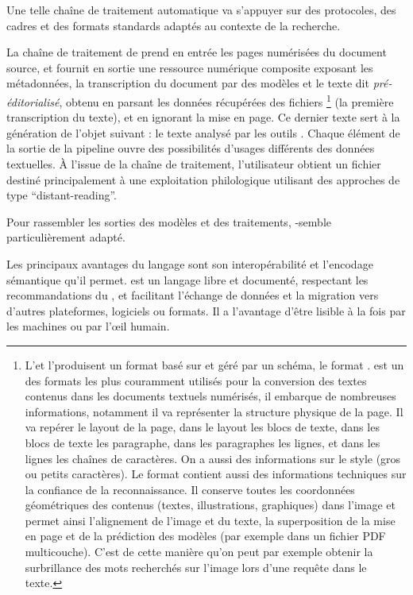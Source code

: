 Une telle chaîne de traitement automatique va s'appuyer sur des protocoles, des cadres et des formats standards adaptés au contexte de la recherche. 

La chaîne de traitement de \gaga prend en entrée les pages numérisées du document
source, et fournit en sortie une ressource numérique composite exposant
les métadonnées, la transcription du document par des
modèles \htr et le texte dit \textit{pré-éditorialisé}, obtenu en parsant les données
récupérées des fichiers \alto\footnote{L'\ocr et l'\htr produisent un
  format basé sur \xml et géré par un schéma, le format \alto. \alto est un des formats les
  plus couramment utilisés pour la conversion des textes contenus dans
  les documents textuels numérisés, il embarque de nombreuses
  informations, notamment il va représenter la structure physique de la
  page. Il va repérer le layout de la page, dans le layout les blocs de
  texte, dans les blocs de texte les paragraphe, dans les paragraphes
  les lignes, et dans les lignes les chaînes de caractères. On a aussi
  des informations sur le style (gros ou petits caractères). Le format
  \alto contient aussi des informations techniques sur la confiance de la
  reconnaissance. Il conserve toutes les coordonnées géométriques des
  contenus (textes, illustrations, graphiques) dans l'image et permet
  ainsi l'alignement de l'image et du texte, la superposition de la mise
  en page et de la prédiction des modèles (par exemple dans un fichier
  PDF multicouche). C'est de cette manière qu'on peut par exemple
  obtenir la surbrillance des mots recherchés sur l'image lors d'une
  requête dans le texte.} (la première transcription du texte), et en
ignorant la mise en page. Ce dernier texte sert à la génération de
l'objet suivant : le texte analysé par les outils \tal. Chaque élément de
la sortie de la pipeline ouvre des possibilités d'usages différents des
données textuelles. À l'issue de la chaîne de traitement, l'utilisateur
obtient un fichier \tei destiné principalement à une exploitation
philologique utilisant des approches de type ``distant-reading''. 

Pour rassembler les sorties des modèles et des traitements, \xml-\tei semble particulièrement adapté.

Les principaux avantages du langage \xml sont son interopérabilité et l'encodage sémantique qu'il permet. \xml est un langage libre et documenté, respectant les recommandations du \wtc, et facilitant l'échange de données et la migration vers d'autres plateformes, logiciels ou formats. Il a l'avantage d'être lisible à la fois par les machines ou par l’œil humain.

